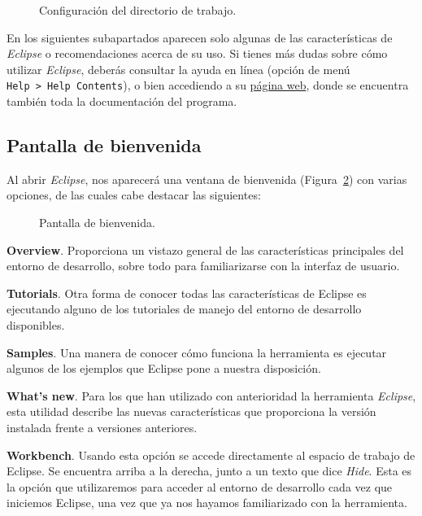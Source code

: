 \documentclass[
  spanish,
  11pt,
  a4paper,
  DIV=11,
  numbers=noendperiod]{scrartcl}
\begin{document}
\begin{figure}
\caption{Configuración del directorio de trabajo.}\label{fig-workspace_eclipse}
\end{figure}

En los siguientes subapartados aparecen solo algunas de las características de \emph{Eclipse} o recomendaciones acerca de su uso. Si tienes más dudas sobre cómo utilizar \emph{Eclipse}, deberás consultar la ayuda en línea (opción de menú \texttt{Help\ \textgreater{}\ Help\ Contents}), o bien accediendo a su \href{http://help.eclipse.org/}{página web}, donde se encuentra también toda la documentación del programa.

\subsection{Pantalla de bienvenida}\label{pantalla-de-bienvenida}

Al abrir \emph{Eclipse}, nos aparecerá una ventana de bienvenida (Figura~\ref{fig-welcome_eclipse}) con varias opciones, de las cuales cabe destacar las siguientes:

\begin{figure}
\caption{Pantalla de bienvenida.}\label{fig-welcome_eclipse}
\end{figure}

\textbf{Overview}. Proporciona un vistazo general de las características principales del entorno de desarrollo, sobre todo para familiarizarse con la interfaz de usuario.

\textbf{Tutorials}. Otra forma de conocer todas las características de Eclipse es ejecutando alguno de los tutoriales de manejo del entorno de desarrollo disponibles.

\textbf{Samples}. Una manera de conocer cómo funciona la herramienta es ejecutar algunos de los ejemplos que Eclipse pone a nuestra disposición.

\textbf{What's new}. Para los que han utilizado con anterioridad la herramienta \emph{Eclipse}, esta utilidad describe las nuevas características que proporciona la versión instalada frente a versiones anteriores.

\textbf{Workbench}. Usando esta opción se accede directamente al espacio de trabajo de Eclipse. Se encuentra arriba a la derecha, junto a un texto que dice \emph{Hide}. Esta es la opción que utilizaremos para acceder al entorno de desarrollo cada vez que iniciemos Eclipse, una vez que ya nos hayamos familiarizado con la herramienta.
\end{document}
